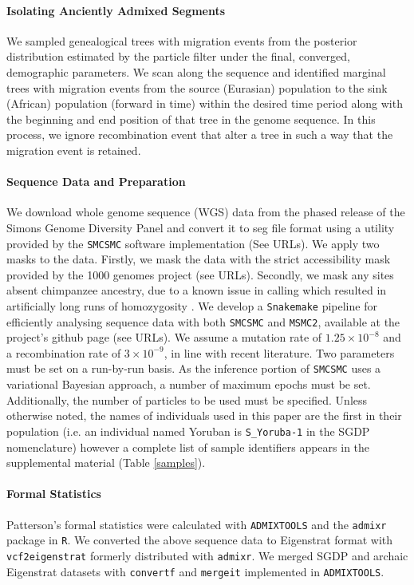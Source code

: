 \documentclass{article}
\begin{document}
\paragraph{Isolating Anciently Admixed Segments} We sampled genealogical trees with migration events from the posterior distribution estimated by the particle filter under the final, converged, demographic parameters. We scan along the sequence and identified marginal trees with migration events from the source (Eurasian) population to the sink (African) population (forward in time) within the desired time period along with the beginning and end position of that tree in the genome sequence. In this process, we ignore recombination event that alter a tree in such a way that the migration event is retained.  

\paragraph{Sequence Data and Preparation}

We download whole genome sequence (WGS) data from the phased release of the Simons Genome Diversity Panel and convert it to seg file format using a utility provided by the {\tt SMCSMC} software implementation (See URLs). We apply two masks to the data. Firstly, we mask the data with the strict accessibility mask provided by the 1000 genomes project (see URLs). Secondly, we mask any sites absent chimpanzee ancestry, due to a known issue in calling which resulted in artificially long runs of homozygosity \cite{Wang2019a}. We develop a {\tt Snakemake} \cite{Koster2012} pipeline for efficiently analysing sequence data with both {\tt SMCSMC} and {\tt MSMC2}, available at the project's github page (see URLs). We assume a mutation rate of $1.25\times10^{-8}$ and a recombination rate of $3\times10^{-9}$, in line with recent literature. Two parameters must be set on a run-by-run basis. As the inference portion of {\tt SMCSMC} uses a variational Bayesian approach, a number of maximum epochs must be set. Additionally, the number of particles to be used must be specified. Unless otherwise noted, the names of individuals used in this paper are the first in their population (i.e. an individual named Yoruban is {\tt S\_Yoruba-1} in the SGDP nomenclature) however a complete list of sample identifiers appears in the supplemental material (Table \ref{samples}). 


\paragraph{Formal Statistics} Patterson's formal statistics were calculated with {\tt ADMIXTOOLS} \cite{Patterson2012} and the {\tt admixr} package \cite{Petr2019} in {\tt R}. We converted the above sequence data to Eigenstrat format with {\tt vcf2eigenstrat} %
formerly distributed with {\tt admixr}. We merged SGDP and archaic Eigenstrat datasets with {\tt convertf} and {\tt mergeit} implemented in {\tt ADMIXTOOLS}. 
\end{document}
